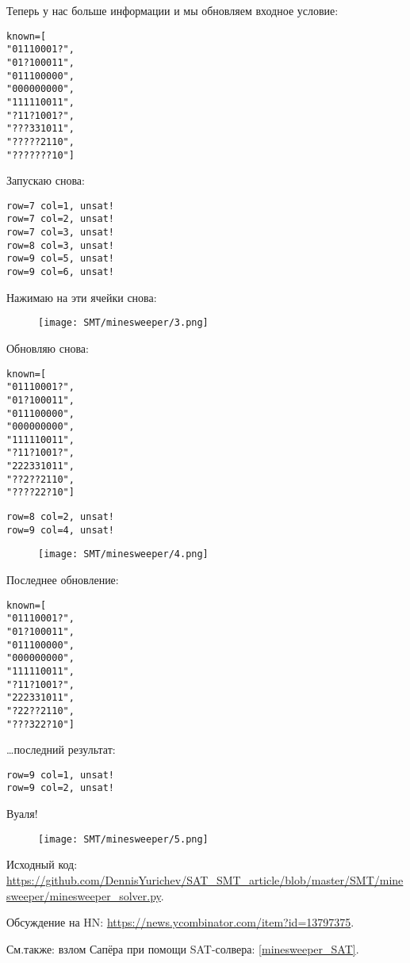 Теперь у нас больше информации и мы обновляем входное условие:

\begin{lstlisting}
known=[
"01110001?",
"01?100011",
"011100000",
"000000000",
"111110011",
"?11?1001?",
"???331011",
"?????2110",
"???????10"]
\end{lstlisting}

Запускаю снова:

\begin{lstlisting}
row=7 col=1, unsat!
row=7 col=2, unsat!
row=7 col=3, unsat!
row=8 col=3, unsat!
row=9 col=5, unsat!
row=9 col=6, unsat!
\end{lstlisting}

Нажимаю на эти ячейки снова:

\begin{figure}[H]
\centering
\texttt{[image: SMT/minesweeper/3.png]}
\end{figure}

Обновляю снова:

\begin{lstlisting}
known=[
"01110001?",
"01?100011",
"011100000",
"000000000",
"111110011",
"?11?1001?",
"222331011",
"??2??2110",
"????22?10"]
\end{lstlisting}

\begin{lstlisting}
row=8 col=2, unsat!
row=9 col=4, unsat!
\end{lstlisting}

\begin{figure}[H]
\centering
\texttt{[image: SMT/minesweeper/4.png]}
\end{figure}

Последнее обновление:

\begin{lstlisting}
known=[
"01110001?",
"01?100011",
"011100000",
"000000000",
"111110011",
"?11?1001?",
"222331011",
"?22??2110",
"???322?10"]
\end{lstlisting}

\dots последний результат:

\begin{lstlisting}
row=9 col=1, unsat!
row=9 col=2, unsat!
\end{lstlisting}

Вуаля!

\begin{figure}[H]
\centering
\texttt{[image: SMT/minesweeper/5.png]}
\end{figure}

Исходный код: \url{https://github.com/DennisYurichev/SAT_SMT_article/blob/master/SMT/minesweeper/minesweeper_solver.py}.

Обсуждение на HN: \url{https://news.ycombinator.com/item?id=13797375}.

См.также: взлом Сапёра при помощи SAT-солвера: \ref{minesweeper_SAT}.

